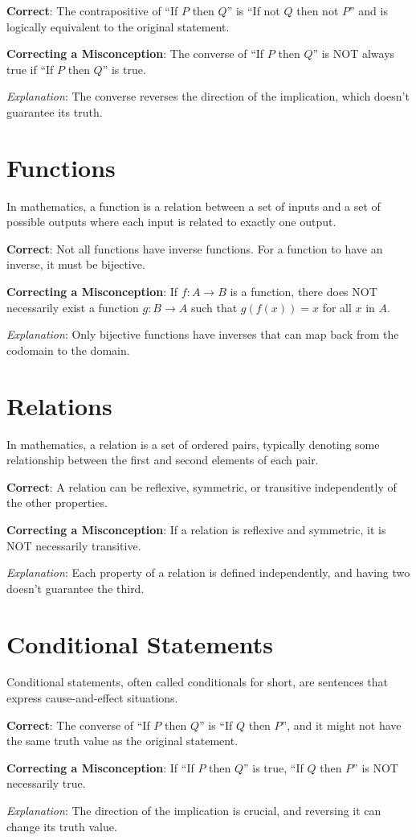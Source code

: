 \documentclass[12pt]{article}
\begin{document}
\textbf{Correct}: The contrapositive of ``If \(P\) then \(Q\)'' is ``If not \(Q\) then not \(P\)'' and is logically equivalent to the original statement.

\textbf{Correcting a Misconception}: The converse of ``If \(P\) then \(Q\)'' is NOT always true if ``If \(P\) then \(Q\)'' is true.

\textit{Explanation}: The converse reverses the direction of the implication, which doesn't guarantee its truth.

\section*{Functions}

In mathematics, a function is a relation between a set of inputs and a set of possible outputs where each input is related to exactly one output.

\textbf{Correct}: Not all functions have inverse functions. For a function to have an inverse, it must be bijective.

\textbf{Correcting a Misconception}: If \(f: A \rightarrow B\) is a function, there does NOT necessarily exist a function \(g: B \rightarrow A\) such that \(g(f(x)) = x\) for all \(x\) in \(A\).

\textit{Explanation}: Only bijective functions have inverses that can map back from the codomain to the domain.

\section*{Relations}

In mathematics, a relation is a set of ordered pairs, typically denoting some relationship between the first and second elements of each pair.

\textbf{Correct}: A relation can be reflexive, symmetric, or transitive independently of the other properties.

\textbf{Correcting a Misconception}: If a relation is reflexive and symmetric, it is NOT necessarily transitive.

\textit{Explanation}: Each property of a relation is defined independently, and having two doesn't guarantee the third.

\section*{Conditional Statements}

Conditional statements, often called conditionals for short, are sentences that express cause-and-effect situations.

\textbf{Correct}: The converse of ``If \(P\) then \(Q\)'' is ``If \(Q\) then \(P\)'', and it might not have the same truth value as the original statement.

\textbf{Correcting a Misconception}: If ``If \(P\) then \(Q\)'' is true, ``If \(Q\) then \(P\)'' is NOT necessarily true.

\textit{Explanation}: The direction of the implication is crucial, and reversing it can change its truth value.
\end{document}
